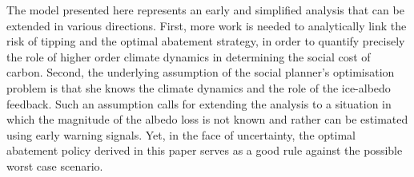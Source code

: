 \documentclass[11pt]{article}
\begin{document}
The model presented here represents an early and simplified analysis that can be extended in various directions. First, more work is needed to analytically link the risk of tipping and the optimal abatement strategy, in order to quantify precisely the role of higher order climate dynamics in determining the social cost of carbon. Second, the underlying assumption of the social planner's optimisation problem is that she knows the climate dynamics and the role of the ice-albedo feedback. Such an assumption calls for extending the analysis to a situation in which the magnitude of the albedo loss is not known and rather can be estimated using early warning signals. Yet, in the face of uncertainty, the optimal abatement policy derived in this paper serves as a good rule against the possible worst case scenario.

\newpage


\newpage\appendix

\end{document}
